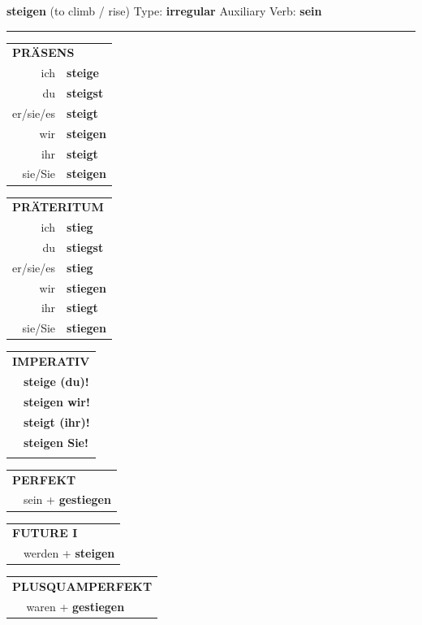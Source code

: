\documentclass[10pt,a4paper]{revtex4-2}
\begin{document}
\begin{verbbox}
    {\Large \bf steigen} (to climb / rise) \hfill Type: \textbf{irregular} \hfill Auxiliary Verb: \textbf{sein} 
    
     \vspace{5pt}

    \hrule
    
    \vspace{5pt}

  \begin{tabular}{rl}
     \multicolumn{2}{l}{\textbf{PRÄSENS} }\\
    ich & \textbf{steige}\\
    du & \textbf{steigst}\\
    er/sie/es & \textbf{steigt}\\
    wir & \textbf{steigen}\\
    ihr & \textbf{steigt}\\
    sie/Sie & \textbf{steigen}\\
  \end{tabular}
  \hfill
  \begin{tabular}{rl}
    \multicolumn{2}{l}{\textbf{PRÄTERITUM} }\\
    ich & \textbf{stieg}\\
    du & \textbf{stiegst}\\
    er/sie/es & \textbf{stieg}\\
    wir & \textbf{stiegen}\\
    ihr & \textbf{stiegt}\\
    sie/Sie & \textbf{stiegen}\\
  \end{tabular}
  \hfill
  \begin{tabular}{rl}
     \multicolumn{2}{l}{\textbf{IMPERATIV} }\\
   & \textbf{steige (du)!}\\
   & \textbf{steigen wir!}\\
   & \textbf{steigt (ihr)!}\\
   & \textbf{steigen Sie!}\\
   & \vspace{10pt}
  \end{tabular}

 \vspace{10pt}

 \begin{tabular}{rl}
     \multicolumn{2}{l}{\textbf{PERFEKT}}\\
   & sein + \textbf{gestiegen}\\
  \end{tabular}
\hfill
\begin{tabular}{rl}
    \multicolumn{2}{l}{\textbf{FUTURE I}}\\
   & werden + \textbf{steigen}\\
  \end{tabular}
\hfill
\begin{tabular}{rl}
    \multicolumn{2}{l}{\textbf{PLUSQUAMPERFEKT}}\\
   & waren + \textbf{gestiegen}\\
  \end{tabular}


\end{verbbox}
\end{document}
